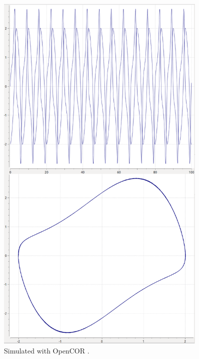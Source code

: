 \begin{figure}[ht]
\begin{minipage}{0.47\textwidth}
        \includegraphics[width=0.9\textwidth]{examples/vanderpol-cellml/results/opencor/plot1-2}
        \caption{Simulated with OpenCOR \citep{garny2015opencor}.}
    \end{minipage}
    \label{fig:lorenz-cellml}
\end{figure}


